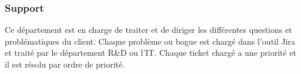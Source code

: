 \subsubsection{Support}
Ce département est en charge de traiter et de diriger les différentes questions et problématiques du client.
Chaque problème ou bogue est chargé dans l'outil Jira et traité par le département R\&D ou l'IT.
Chaque ticket chargé a une priorité et il est résolu par ordre de priorité.

